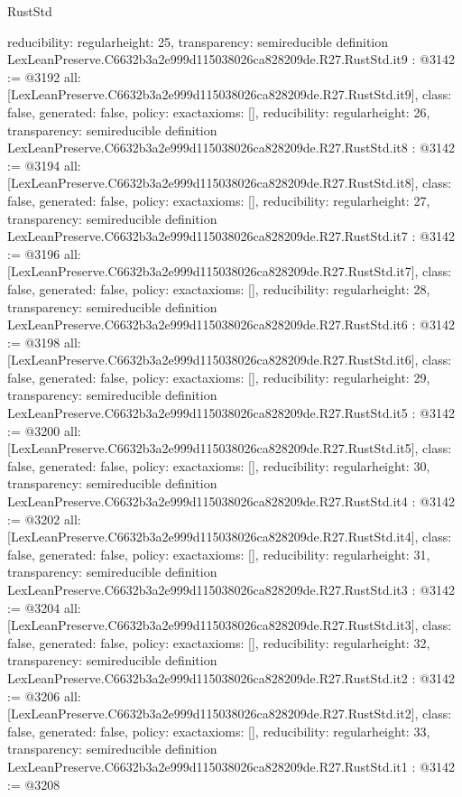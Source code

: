 \begin{lexlean}{RustStd}
\begin{coremodule}
{  reducibility: regular{height: 25},
  transparency: semireducible
}
definition LexLeanPreserve.C6632b3a2e999d115038026ca828209de.R27.RustStd.it9 : @3142 := @3192 {
  all: [LexLeanPreserve.C6632b3a2e999d115038026ca828209de.R27.RustStd.it9],
  class: false,
  generated: false,
  policy: exact{axioms: []},
  reducibility: regular{height: 26},
  transparency: semireducible
}
definition LexLeanPreserve.C6632b3a2e999d115038026ca828209de.R27.RustStd.it8 : @3142 := @3194 {
  all: [LexLeanPreserve.C6632b3a2e999d115038026ca828209de.R27.RustStd.it8],
  class: false,
  generated: false,
  policy: exact{axioms: []},
  reducibility: regular{height: 27},
  transparency: semireducible
}
definition LexLeanPreserve.C6632b3a2e999d115038026ca828209de.R27.RustStd.it7 : @3142 := @3196 {
  all: [LexLeanPreserve.C6632b3a2e999d115038026ca828209de.R27.RustStd.it7],
  class: false,
  generated: false,
  policy: exact{axioms: []},
  reducibility: regular{height: 28},
  transparency: semireducible
}
definition LexLeanPreserve.C6632b3a2e999d115038026ca828209de.R27.RustStd.it6 : @3142 := @3198 {
  all: [LexLeanPreserve.C6632b3a2e999d115038026ca828209de.R27.RustStd.it6],
  class: false,
  generated: false,
  policy: exact{axioms: []},
  reducibility: regular{height: 29},
  transparency: semireducible
}
definition LexLeanPreserve.C6632b3a2e999d115038026ca828209de.R27.RustStd.it5 : @3142 := @3200 {
  all: [LexLeanPreserve.C6632b3a2e999d115038026ca828209de.R27.RustStd.it5],
  class: false,
  generated: false,
  policy: exact{axioms: []},
  reducibility: regular{height: 30},
  transparency: semireducible
}
definition LexLeanPreserve.C6632b3a2e999d115038026ca828209de.R27.RustStd.it4 : @3142 := @3202 {
  all: [LexLeanPreserve.C6632b3a2e999d115038026ca828209de.R27.RustStd.it4],
  class: false,
  generated: false,
  policy: exact{axioms: []},
  reducibility: regular{height: 31},
  transparency: semireducible
}
definition LexLeanPreserve.C6632b3a2e999d115038026ca828209de.R27.RustStd.it3 : @3142 := @3204 {
  all: [LexLeanPreserve.C6632b3a2e999d115038026ca828209de.R27.RustStd.it3],
  class: false,
  generated: false,
  policy: exact{axioms: []},
  reducibility: regular{height: 32},
  transparency: semireducible
}
definition LexLeanPreserve.C6632b3a2e999d115038026ca828209de.R27.RustStd.it2 : @3142 := @3206 {
  all: [LexLeanPreserve.C6632b3a2e999d115038026ca828209de.R27.RustStd.it2],
  class: false,
  generated: false,
  policy: exact{axioms: []},
  reducibility: regular{height: 33},
  transparency: semireducible
}
definition LexLeanPreserve.C6632b3a2e999d115038026ca828209de.R27.RustStd.it1 : @3142 := @3208 {
}
\end{coremodule}
\end{lexlean}
